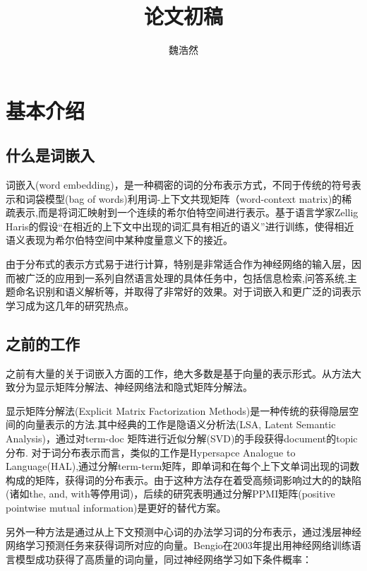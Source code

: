 \documentclass[13pt]{article}
\begin{document}
\title{论文初稿}
\author{魏浩然}
\maketitle
\section{基本介绍}
\subsection{什么是词嵌入}
词嵌入(word embedding)，是一种稠密的词的分布表示方式，不同于传统的符号表示和词袋模型(bag of words)利用词-上下文共现矩阵（word-context matrix)的稀疏表示,而是将词汇映射到一个连续的希尔伯特空间进行表示。基于语言学家Zellig Haris的假设“在相近的上下文中出现的词汇具有相近的语义”\cite{harris1954distributional}进行训练，使得相近语义表现为希尔伯特空间中某种度量意义下的接近。

由于分布式的表示方式易于进行计算，特别是非常适合作为神经网络的输入层，因而被广泛的应用到一系列自然语言处理的具体任务中，包括信息检索\cite{manning2008introduction},问答系统\cite{tellex2003quantitative},主题命名识别\cite{turian2010word}和语义解析\cite{socher2011parsing}等，并取得了非常好的效果。对于词嵌入和更广泛的词表示学习成为这几年的研究热点。

\subsection{之前的工作}
之前有大量的关于词嵌入方面的工作，绝大多数是基于向量的表示形式。从方法大致分为显示矩阵分解法、神经网络法和隐式矩阵分解法。

显示矩阵分解法(Explicit Matrix Factorization Methods)是一种传统的获得隐层空间的向量表示的方法.其中经典的工作是隐语义分析法(LSA, Latent Semantic Analysis)，通过对term-doc 矩阵进行近似分解(SVD)的手段获得document的topic分布. 对于词分布表示而言，类似的工作是Hypersapce Analogue to Language(HAL)\cite{lund1996producing},通过分解term-term矩阵，即单词和在每个上下文单词出现的词数构成的矩阵，获得词的分布表示。由于这种方法存在着受高频词影响过大的的缺陷(诸如the, and, with等停用词)，后续的研究表明通过分解PPMI矩阵(positive pointwise mutual information)是更好的替代方案\cite{lebret2013word}。

另外一种方法是通过从上下文预测中心词的办法学习词的分布表示，通过浅层神经网络学习预测任务来获得词所对应的向量。Bengio在2003年提出用神经网络训练语言模型成功获得了高质量的词向量\cite{bengio2006neural}，同过神经网络学习如下条件概率：
\end{document}
